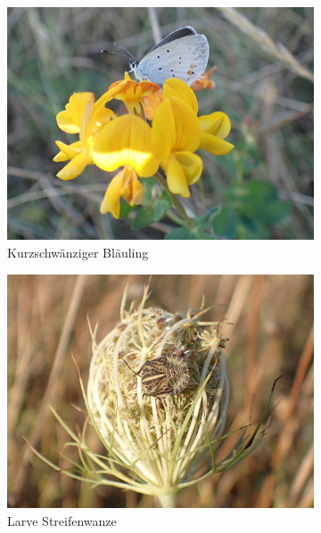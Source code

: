 \documentclass[11pt]{article}
\begin{document}
\begin{figure}[h!]
  \centering
  \begin{subfigure}[b]{0.44\linewidth}
    \includegraphics[width=\linewidth]{img/randkanal/blauling.jpg}
    \caption{Kurzschwänziger Bläuling}
  \end{subfigure}
  \begin{subfigure}[b]{0.44\linewidth}
    \includegraphics[width=\linewidth]{img/randkanal/streifenwanze.jpg}
    \caption{Larve Streifenwanze}
  \end{subfigure}
  \begin{subfigure}[b]{0.45\linewidth}

\end{subfigure}
\end{figure}
\end{document}
